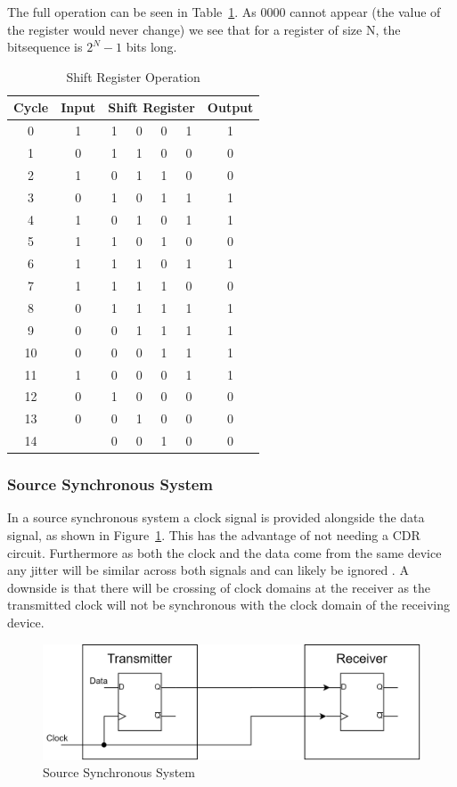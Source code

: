 The full operation can be seen in Table~\ref{tab:shift_reg}. As 0000 cannot
appear (the value of the register would never change) we see that for a register of size N, the
bitsequence is $2^N - 1$ bits long. 
\begin{table}[ht]
    \centering
    \begin{tabular}{|c|c|c c c c|c|}
    \hline
    Cycle & Input & \multicolumn{4}{|c|}{Shift Register} & Output \\
    \hline
     0  & 1 & 1 & 0 & 0 & 1 & 1 \\
     1  & 0 & 1 & 1 & 0 & 0 & 0 \\
     2  & 1 & 0 & 1 & 1 & 0 & 0 \\
     3  & 0 & 1 & 0 & 1 & 1 & 1 \\
     4  & 1 & 0 & 1 & 0 & 1 & 1 \\
     5  & 1 & 1 & 0 & 1 & 0 & 0 \\
     6  & 1 & 1 & 1 & 0 & 1 & 1 \\
     7  & 1 & 1 & 1 & 1 & 0 & 0 \\
     8  & 0 & 1 & 1 & 1 & 1 & 1 \\
     9  & 0 & 0 & 1 & 1 & 1 & 1 \\
     10 & 0 & 0 & 0 & 1 & 1 & 1 \\
     11 & 1 & 0 & 0 & 0 & 1 & 1 \\
     12 & 0 & 1 & 0 & 0 & 0 & 0 \\
     13 & 0 & 0 & 1 & 0 & 0 & 0 \\
     14 &   & 0 & 0 & 1 & 0 & 0 \\
    \hline
    \end{tabular}
    \caption{Shift Register Operation}
    \label{tab:shift_reg}
\end{table}

\subsubsection{Source Synchronous System}%
\label{ssub:source_synchronous_system}
In a source synchronous system a clock signal is provided alongside the data
signal, as shown in Figure~\ref{fig:source_sync}. This has the advantage of not
needing a CDR circuit. Furthermore as both the clock and the data come from the
same device any jitter will be similar across both signals and can likely be
ignored \cite{ragab2011receiver}.   A downside is that there will be crossing
of clock domains at the receiver as the transmitted clock will not be
synchronous with the clock domain of the receiving device.
\begin{figure}[ht]
    \centering
    \includegraphics[width=0.5\linewidth]{img/source_sync.png}
    \caption{Source Synchronous System}%
    \label{fig:source_sync}
\end{figure}



